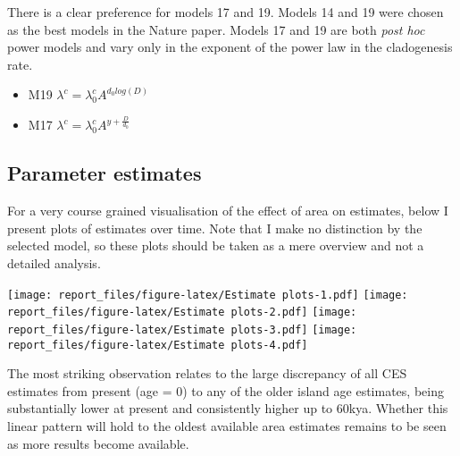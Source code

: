 \documentclass[
]{article}
\providecommand{\tightlist}{%
  \setlength{\itemsep}{0pt}\setlength{\parskip}{0pt}}
\begin{document}
There is a clear preference for models 17 and 19. Models 14 and 19 were
chosen as the best models in the Nature paper. Models 17 and 19 are both
\emph{post hoc} power models and vary only in the exponent of the power
law in the cladogenesis rate.

\begin{itemize}
\tightlist
\item
  M19 \(\lambda^c = \lambda^c_0A^{d_0log(D)}\)
\item
  M17 \(\lambda^c = \lambda^c_0A^{y+\frac{D}{d_0}}\)
\end{itemize}

\hypertarget{parameter-estimates}{%
\subsection{Parameter estimates}\label{parameter-estimates}}

For a very course grained visualisation of the effect of area on
estimates, below I present plots of estimates over time. Note that I
make no distinction by the selected model, so these plots should be
taken as a mere overview and not a detailed analysis.

\texttt{[image: report\_files/figure-latex/Estimate plots-1.pdf]}
\texttt{[image: report\_files/figure-latex/Estimate plots-2.pdf]}
\texttt{[image: report\_files/figure-latex/Estimate plots-3.pdf]}
\texttt{[image: report\_files/figure-latex/Estimate plots-4.pdf]}

The most striking observation relates to the large discrepancy of all
CES estimates from present (age = 0) to any of the older island age
estimates, being substantially lower at present and consistently higher
up to 60kya. Whether this linear pattern will hold to the oldest
available area estimates remains to be seen as more results become
available.
\end{document}
